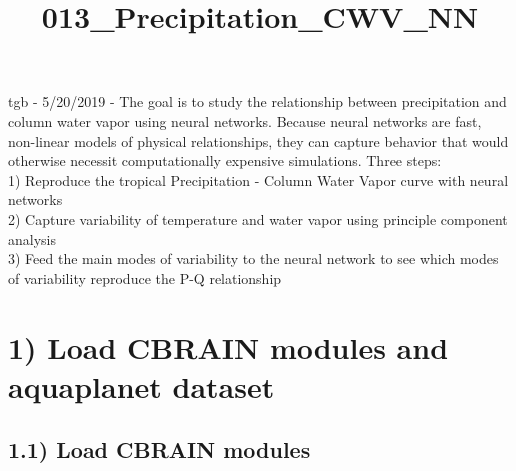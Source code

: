 \documentclass[11pt]{article}
\title{013\_Precipitation\_CWV\_NN}
\begin{document}
    
    
    \maketitle
    
    

    
    tgb - 5/20/2019 - The goal is to study the relationship between
precipitation and column water vapor using neural networks. Because
neural networks are fast, non-linear models of physical relationships,
they can capture behavior that would otherwise necessit computationally
expensive simulations. Three steps:\\
1) Reproduce the tropical Precipitation - Column Water Vapor curve with
neural networks\\
2) Capture variability of temperature and water vapor using principle
component analysis\\
3) Feed the main modes of variability to the neural network to see which
modes of variability reproduce the P-Q relationship

    \hypertarget{load-cbrain-modules-and-aquaplanet-dataset}{%
\section{1) Load CBRAIN modules and aquaplanet
dataset}\label{load-cbrain-modules-and-aquaplanet-dataset}}

    \hypertarget{load-cbrain-modules}{%
\subsection{1.1) Load CBRAIN modules}\label{load-cbrain-modules}}
\end{document}
